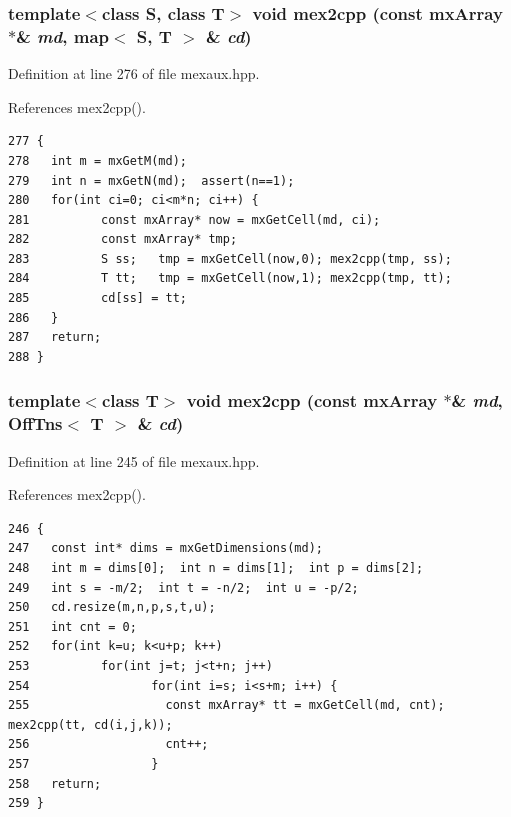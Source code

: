 \subsubsection{\setlength{\rightskip}{0pt plus 5cm}template$<$class S, class T$>$ void mex2cpp (const mx\-Array $\ast$\& {\em md}, map$<$ S, T $>$ \& {\em cd})\hspace{0.3cm}{\tt  [inline]}}\label{mexaux_8hpp_a3616f5cd8c616272e749333695bbb9d_a3616f5cd8c616272e749333695bbb9d}




Definition at line 276 of file mexaux.hpp.

References mex2cpp().

\footnotesize\begin{verbatim}277 {
278   int m = mxGetM(md);
279   int n = mxGetN(md);  assert(n==1);
280   for(int ci=0; ci<m*n; ci++) {
281          const mxArray* now = mxGetCell(md, ci);
282          const mxArray* tmp;
283          S ss;   tmp = mxGetCell(now,0); mex2cpp(tmp, ss);
284          T tt;   tmp = mxGetCell(now,1); mex2cpp(tmp, tt);
285          cd[ss] = tt;
286   }
287   return;
288 }
\end{verbatim}\normalsize 


\subsubsection{\setlength{\rightskip}{0pt plus 5cm}template$<$class T$>$ void mex2cpp (const mx\-Array $\ast$\& {\em md}, Off\-Tns$<$ T $>$ \& {\em cd})\hspace{0.3cm}{\tt  [inline]}}\label{mexaux_8hpp_d2ac705ae79a77cc074ed7443e6c384f_d2ac705ae79a77cc074ed7443e6c384f}




Definition at line 245 of file mexaux.hpp.

References mex2cpp().

\footnotesize\begin{verbatim}246 {
247   const int* dims = mxGetDimensions(md);
248   int m = dims[0];  int n = dims[1];  int p = dims[2];
249   int s = -m/2;  int t = -n/2;  int u = -p/2;
250   cd.resize(m,n,p,s,t,u);
251   int cnt = 0;
252   for(int k=u; k<u+p; k++)
253          for(int j=t; j<t+n; j++)
254                 for(int i=s; i<s+m; i++) {
255                   const mxArray* tt = mxGetCell(md, cnt);                 mex2cpp(tt, cd(i,j,k));
256                   cnt++;
257                 }
258   return;
259 }
\end{verbatim}\normalsize 


